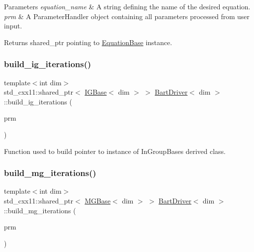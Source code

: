 \begin{DoxyParams}{Parameters}
{\em equation\+\_\+name} & A string defining the name of the desired equation. \\
\hline
{\em prm} & A Parameter\+Handler object containing all parameters processed from user input. \\
\hline
\end{DoxyParams}
\begin{DoxyReturn}{Returns}
shared\+\_\+ptr pointing to \hyperlink{class_equation_base}{Equation\+Base} instance. 
\end{DoxyReturn}
\mbox{\label{class_bart_driver_adc7ebcc2b3d02b7058410abef7e1b8a5}} 
\subsubsection{\texorpdfstring{build\+\_\+ig\+\_\+iterations()}{build\_ig\_iterations()}}
{\footnotesize\ttfamily template$<$int dim$>$ \\
std\+\_\+cxx11\+::shared\+\_\+ptr$<$ \hyperlink{class_i_g_base}{I\+G\+Base}$<$ dim $>$ $>$ \hyperlink{class_bart_driver}{Bart\+Driver}$<$ dim $>$\+::build\+\_\+ig\+\_\+iterations (\begin{DoxyParamCaption}\item[{const Parameter\+Handler \&}]{prm }\end{DoxyParamCaption})\hspace{0.3cm}{\ttfamily [private]}}



Function used to build pointer to instance of In\+Group\+Base\textquotesingle{}s derived class. 

\mbox{\label{class_bart_driver_af0c96d5fe57cdb8df75e1fb93ce6196b}} 
\subsubsection{\texorpdfstring{build\+\_\+mg\+\_\+iterations()}{build\_mg\_iterations()}}
{\footnotesize\ttfamily template$<$int dim$>$ \\
std\+\_\+cxx11\+::shared\+\_\+ptr$<$ \hyperlink{class_m_g_base}{M\+G\+Base}$<$ dim $>$ $>$ \hyperlink{class_bart_driver}{Bart\+Driver}$<$ dim $>$\+::build\+\_\+mg\+\_\+iterations (\begin{DoxyParamCaption}\item[{const Parameter\+Handler \&}]{prm }\end{DoxyParamCaption})\hspace{0.3cm}{\ttfamily [private]}}



